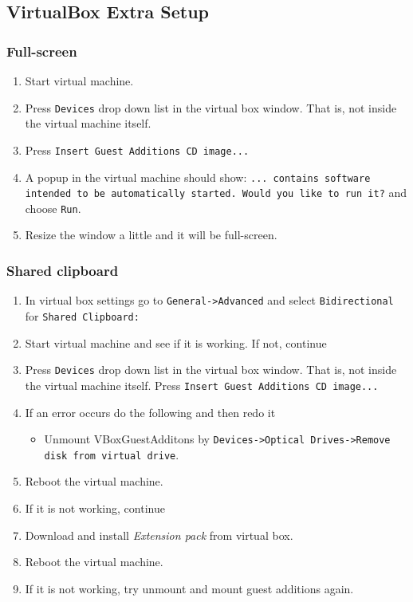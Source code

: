 \subsection{VirtualBox Extra Setup}
\subsubsection{Full-screen}
\begin{enumerate}
    \item Start virtual machine.
    \item Press \texttt{Devices} drop down list in the virtual box window. That is, not inside the virtual machine itself.
    \item Press \texttt{Insert Guest Additions CD image...}
    \item A popup in the virtual machine should show: \texttt{... contains software intended to be automatically started. Would you like to run it?} and choose \texttt{Run}.
    \item Resize the window a little and it will be full-screen.
\end{enumerate}

\subsubsection{Shared clipboard}
\begin{enumerate}
    \item In virtual box settings go to \texttt{General->Advanced} and select \texttt{Bidirectional} for \texttt{Shared Clipboard:} 
    \item Start virtual machine and see if it is working. If not, continue
    \item Press \texttt{Devices} drop down list in the virtual box window. That is, not inside the virtual machine itself. Press \texttt{Insert Guest Additions CD image...}
    \item If an error occurs do the following and then redo it
    \begin{itemize}
        \item Unmount VBoxGuestAdditons by \texttt{Devices->Optical Drives->Remove disk from virtual drive}.
    \end{itemize}
    \item Reboot the virtual machine.
    \item If it is not working, continue
    \item Download and install \textit{Extension pack} from virtual box.
    \item Reboot the virtual machine.
    \item If it is not working, try unmount and mount guest additions again.
\end{enumerate}

